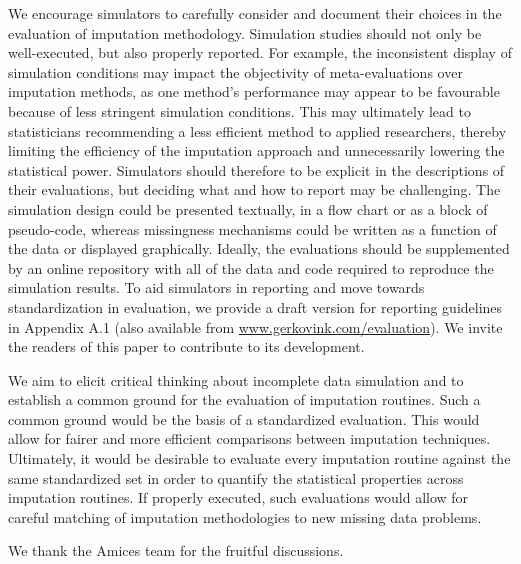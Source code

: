 \documentclass[bimj,fleqn]{w-art}
\begin{document}
We encourage simulators to carefully consider and document their choices in the evaluation of imputation methodology. Simulation studies should not only be well-executed, but also properly reported. For example, the inconsistent display of simulation conditions may impact the objectivity of meta-evaluations over imputation methods, as one method's performance may appear to be favourable because of less stringent simulation conditions. This may ultimately lead to statisticians recommending a less efficient method to applied researchers, thereby limiting the efficiency of the imputation approach and unnecessarily lowering the statistical power. Simulators should therefore to be explicit in the descriptions of their evaluations, but deciding what and how to report may be challenging. The simulation design could be presented textually, in a flow chart or as a block of pseudo-code, whereas missingness mechanisms could be written as a function of the data or displayed graphically. Ideally, the evaluations should be supplemented by an online repository with all of the data and code required to reproduce the simulation results. To aid simulators in reporting and move towards standardization in evaluation, we provide a draft version for reporting guidelines in Appendix A.1 (also available from \underline{www.gerkovink.com/evaluation}). We invite the readers of this paper to contribute to its development. 

We aim to elicit critical thinking about incomplete data simulation and to establish a common ground for the evaluation of imputation routines. Such a common ground would be the basis of a standardized evaluation. This would allow for fairer and more efficient comparisons between imputation techniques. Ultimately, it would be desirable to evaluate every imputation routine against the same standardized set in order to quantify the statistical properties across imputation routines. If properly executed, such evaluations would allow for careful matching of imputation methodologies to new missing data problems. 



\begin{acknowledgement}
We thank the Amices team for the fruitful discussions.
\end{acknowledgement}
\vspace*{1pc}


\end{document}
